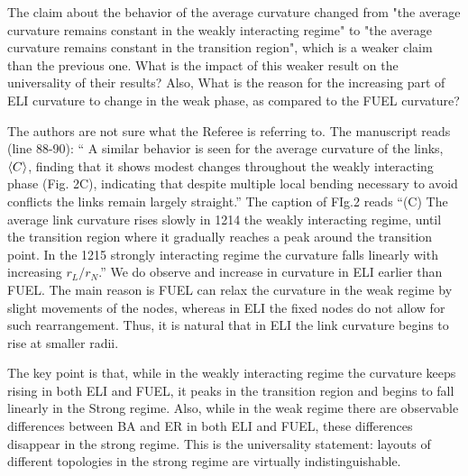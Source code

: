 \documentclass[11pt]{article}
\begin{document}
\begin{response}{

The claim about the behavior of the average curvature changed from "the average curvature remains constant in the weakly interacting regime" to "the average curvature remains 
constant in the transition region", which is a weaker claim than the previous one. 
What is the impact of this weaker result on the universality of their results? 
Also, What is the reason for the increasing part of ELI curvature to change in 
the weak phase, as compared to the FUEL curvature? 
}

The authors are not sure what the Referee is referring to. 
The manuscript reads (line 88-90): `` A similar behavior is seen for the average curvature of the links, $\left<C\right>$, finding that it shows modest changes throughout the weakly interacting phase (Fig. 2C), indicating that despite multiple local bending necessary to avoid conflicts the links remain largely straight.''
The caption of FIg.2 reads ``(C) The average link curvature rises slowly in
1214 the weakly interacting regime, until the transition region where it gradually reaches a peak around the transition point. In the
1215 strongly interacting regime the curvature falls linearly with increasing $r_L/r_N$.''
We do observe and increase in curvature in ELI earlier than FUEL. 
The main reason is FUEL can relax the curvature in the weak regime by slight movements of the nodes, whereas in ELI the fixed nodes do not allow for such rearrangement. 
Thus, it is natural that in ELI the link curvature begins to rise at smaller radii. 

The key point is that, while in the weakly interacting regime the curvature keeps rising in both ELI and FUEL, it peaks in the transition  region and begins to fall linearly in the Strong regime.
Also, while in the weak regime there are observable differences between BA and ER in both
ELI and FUEL, these differences disappear in the strong regime. 
This is the universality statement: layouts of different topologies in the strong regime are virtually indistinguishable. 

\end{response}
\end{document}
